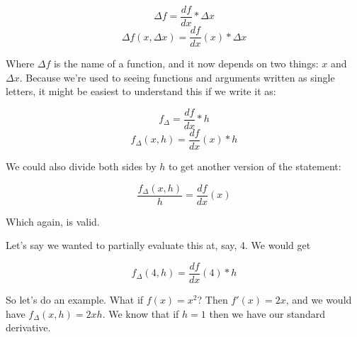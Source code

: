 \documentclass{article}
\begin{document}
$$\Delta f = \frac{df}{dx} * \Delta x$$
$$\Delta f(x, \Delta x) = \frac{df}{dx}(x) * \Delta x$$

Where $\Delta f$ is the name of a function, and it now depends on two things: $x$ and $\Delta x$.  Because we're used to seeing functions and arguments written as single letters, it might be easiest to understand this if we write it as:

$$ f_\Delta = \frac{df}{dx} * h$$
$$ f_\Delta(x, h) = \frac{df}{dx}(x) * h$$



We could also divide both sides by $h$ to get another version of the statement:

$$\frac{ f_\Delta(x, h)}{h} = \frac{df}{dx}(x)$$

Which again, is valid. 

Let's say we wanted to partially evaluate this at, say, 4. We would get

$$ f_\Delta(4, h) = \frac{df}{dx}(4) * h$$

So let's do an example. What if $f(x) = x^2$?  Then $f'(x) = 2x$, and we would have $f_\Delta(x, h) = 2xh$.  We know that if $h = 1$ then we have our standard derivative.
\end{document}
